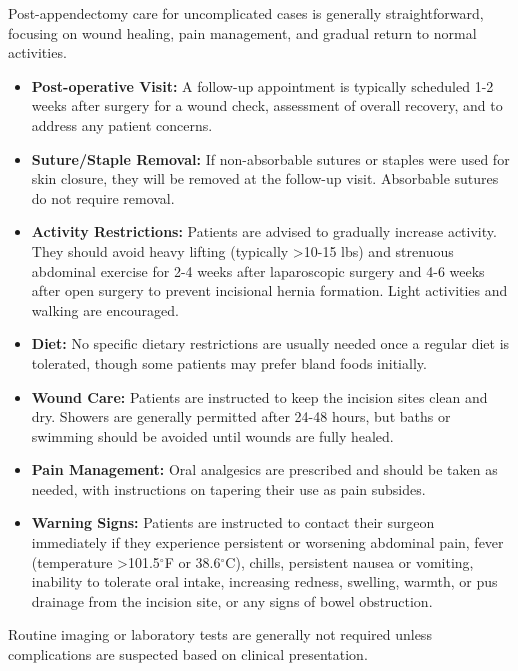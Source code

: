 Post-appendectomy care for uncomplicated cases is generally straightforward, focusing on wound healing, pain management, and gradual return to normal activities.
\begin{itemize}
  \item \textbf{Post-operative Visit:} A follow-up appointment is typically scheduled 1-2 weeks after surgery for a wound check, assessment of overall recovery, and to address any patient concerns.
  \item \textbf{Suture/Staple Removal:} If non-absorbable sutures or staples were used for skin closure, they will be removed at the follow-up visit. Absorbable sutures do not require removal.
  \item \textbf{Activity Restrictions:} Patients are advised to gradually increase activity. They should avoid heavy lifting (typically >10-15 lbs) and strenuous abdominal exercise for 2-4 weeks after laparoscopic surgery and 4-6 weeks after open surgery to prevent incisional hernia formation. Light activities and walking are encouraged.
  \item \textbf{Diet:} No specific dietary restrictions are usually needed once a regular diet is tolerated, though some patients may prefer bland foods initially.
  \item \textbf{Wound Care:} Patients are instructed to keep the incision sites clean and dry. Showers are generally permitted after 24-48 hours, but baths or swimming should be avoided until wounds are fully healed.
  \item \textbf{Pain Management:} Oral analgesics are prescribed and should be taken as needed, with instructions on tapering their use as pain subsides.
\item \textbf{Warning Signs:} Patients are instructed to contact their surgeon immediately if they experience persistent or worsening abdominal pain, fever (temperature >101.5$^{\circ}$F or 38.6$^{\circ}$C), chills, persistent nausea or vomiting, inability to tolerate oral intake, increasing redness, swelling, warmth, or pus drainage from the incision site, or any signs of bowel obstruction.
\end{itemize}
Routine imaging or laboratory tests are generally not required unless complications are suspected based on clinical presentation.

